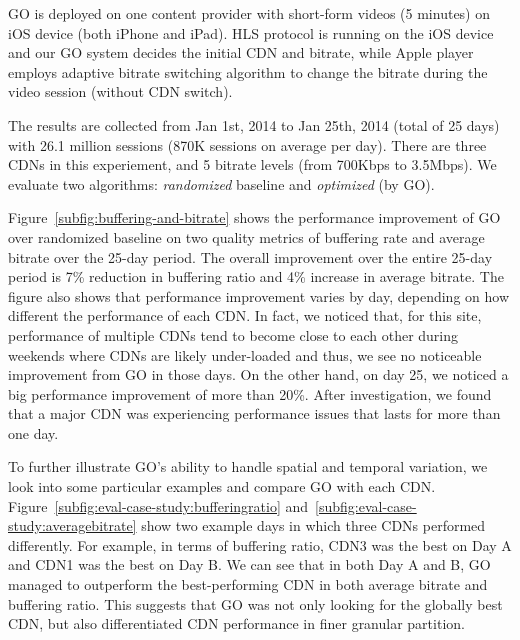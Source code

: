 \label{subsec:eval_setup}

GO is deployed on one content provider with short-form videos (5 minutes) on iOS device (both iPhone and iPad). 
HLS protocol is running on the iOS device and our GO system decides the initial CDN and bitrate, while Apple player employs adaptive 
bitrate switching algorithm to change the bitrate during the video session (without CDN switch). 

The results are collected from Jan 1st, 2014 to Jan 25th, 2014 (total of 25 days) with 26.1 million sessions (870K sessions on average per day).
There are three CDNs in this experiement, and 5 bitrate levels (from 700Kbps to 3.5Mbps). We evaluate two algorithms: {\it randomized} baseline and {\it optimized} (by GO).


\label{subsec:real-world-improvement}

Figure~\ref{subfig:buffering-and-bitrate} shows the performance improvement of GO over randomized baseline on two quality metrics of
buffering rate and average bitrate over the 25-day period. The overall improvement over the entire 25-day period is 7\% reduction in buffering ratio and 4\% increase in 
average bitrate. The figure also shows that performance improvement varies by day, depending on how different the performance of each CDN. 
In fact, we noticed that, for this site, performance of multiple CDNs tend to become close to each other
during weekends where CDNs are likely under-loaded and thus, we see no noticeable improvement from GO in those days. 
On the other hand, on day 25, we noticed a big performance improvement of more than 20\%. After investigation,
we found that a major CDN was experiencing performance issues that lasts for more than one day. 

To further illustrate GO's ability to handle spatial and temporal variation, 
we look into some particular examples and compare GO with each CDN. Figure~\ref{subfig:eval-case-study:bufferingratio} and~\ref{subfig:eval-case-study:averagebitrate} show two example days in which three CDNs performed differently.  For example, in terms of buffering ratio, CDN3 was the best on Day A and CDN1 was the best on Day B. 
We can see that in both Day A and B, GO managed to outperform the best-performing CDN in both average bitrate 
and buffering ratio. This suggests that GO was not only looking for the globally best CDN, but also 
differentiated CDN performance in finer granular partition.

